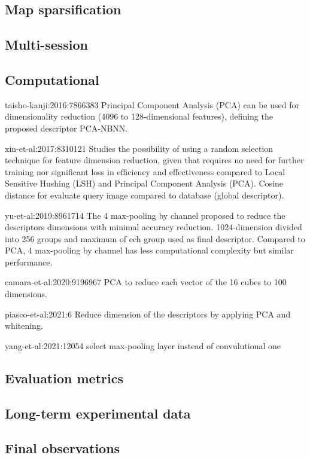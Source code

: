 \subsection{Map sparsification}
\label{sec:discussion:sparsify}

\subsection{Multi-session}
\label{sec:discussion:multisession}

\subsection{Computational}
\label{sec:discussion:computational}

taisho-kanji:2016:7866383
Principal Component Analysis (PCA) can be used for dimensionality reduction (4096 to 128-dimensional features), defining the proposed descriptor PCA-NBNN.

xin-et-al:2017:8310121
Studies the possibility of using a random selection technique for feature dimension reduction, given that requires no need for further training nor significant loss in efficiency and effectiveness compared to Local Sensitive Hushing (LSH) and Principal Component Analysis (PCA).
Cosine distance for evaluate query image compared to database (global descriptor).

yu-et-al:2019:8961714
The 4 max-pooling by channel proposed to reduce the descriptors dimensions with minimal accuracy reduction. 1024-dimension divided into 256 groups and maximum of ech group used as final descriptor. Compared to PCA, 4 max-pooling by channel has less computational complexity but similar performance.

camara-et-al:2020:9196967
PCA to reduce each vector of the 16 cubes to 100 dimensions.

piasco-et-al:2021:6
Reduce dimension of the descriptors by applying PCA and whitening.

yang-et-al:2021:12054
select max-pooling layer instead of convulutional one

\subsection{Evaluation metrics}
\label{sec:discussion:metrics}

\subsection{Long-term experimental data}
\label{sec:discussion:experiments}

%

\subsection{Final observations}
\label{sec:discussion:observations}

